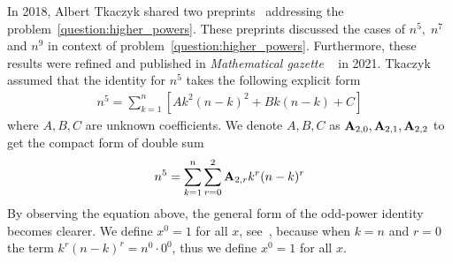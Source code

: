In 2018, Albert Tkaczyk shared two preprints~\cite{tkaczyk2018problem, tkaczyk2018continuation}
addressing the problem~\eqref{question:higher_powers}.
These preprints discussed the cases of  $n^5, \; n^7$ and $n^9$ in context of problem~\eqref{question:higher_powers}.
Furthermore, these results were refined and published in \textit{Mathematical gazette}
~\cite{unusual_identity_for_odd_powers} in 2021.
Tkaczyk assumed that the identity for $n^5$ takes the following explicit form
\begin{align*}
    n^5 = \sum_{k=1}^{n} \left[ A k^2(n-k)^2 + Bk(n-k) + C \right]
\end{align*}
where $A,B,C$ are unknown coefficients.
We denote $A,B,C$ as ${\mathbf{A}} \sb{2,0}, {\mathbf{A}} \sb{2,1}, {\mathbf{A}} \sb{2,2}$
to get the compact form of double sum
\begin{align*}
    n^5 = \sum_{k=1}^{n} \sum_{r=0}^{2} {\mathbf{A}} \sb{2,r} k^r (n-k)^r
\end{align*}
By observing the equation above, the general form of the odd-power identity becomes clearer.
We define $x^0 = 1$ for all $x$, see~\cite[~p. 162]{graham1994concrete},
because when $k=n$ and $r=0$ the term $k^r (n-k)^r = n^0 \cdot 0^0$, thus we define $x^0 = 1$
for all $x$.

